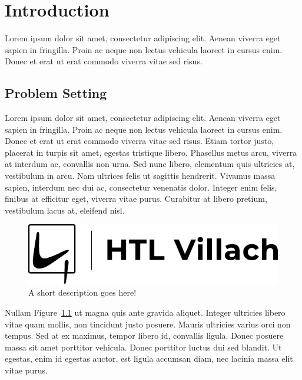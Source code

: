 
\chapter{Introduction}

Lorem ipsum dolor sit amet, consectetur adipiscing elit. Aenean viverra eget sapien in fringilla. Proin ac neque non lectus vehicula laoreet in cursus enim. Donec et erat ut erat commodo viverra vitae sed risus.

\section{Problem Setting}

Lorem ipsum dolor sit amet, consectetur adipiscing elit. Aenean viverra eget sapien in fringilla. Proin ac neque non lectus vehicula laoreet in cursus enim. Donec et erat ut erat commodo viverra vitae sed risus. Etiam tortor justo, placerat in turpis sit amet, egestas tristique libero. Phasellus metus arcu, viverra at interdum ac, convallis non urna. Sed nunc libero, elementum quis ultricies at, vestibulum in arcu. Nam ultrices felis ut sagittis hendrerit. Vivamus massa sapien, interdum nec dui ac, consectetur venenatis dolor. Integer enim felis, finibus at efficitur eget, viverra vitae purus. Curabitur at libero pretium, vestibulum lacus at, eleifend nisl.

\begin{figure}[tb]
\centering
  \begin{center}
    \includegraphics[scale=0.5]{media/images/htl_c_cmyk_rein.pdf}
  \end{center}
\caption{A short description goes here!}
\label{figure_label}
\end{figure}

Nullam Figure~\ref{figure_label} ut magna quis ante gravida aliquet. Integer ultricies libero vitae quam mollis, non tincidunt justo posuere. Mauris ultricies varius orci non tempus. Sed at ex maximus, tempor libero id, convallis ligula. Donec posuere massa sit amet porttitor vehicula. Donec porttitor luctus dui sed blandit. Ut egestas, enim id egestas auctor, est ligula accumsan diam, nec lacinia massa elit vitae purus.

